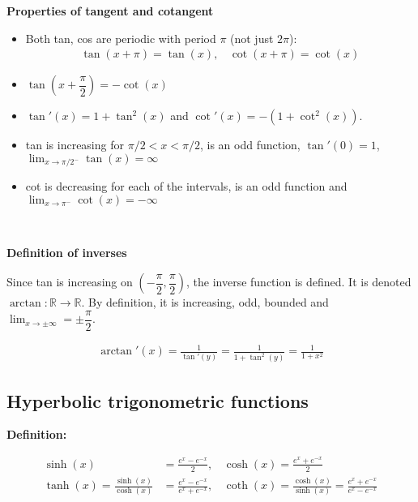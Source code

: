 \documentclass[11pt]{article}
\begin{document}
\textbf{Properties of tangent and cotangent} 
\begin{itemize}
 \item Both tan, cos are periodic with period $\pi$ (not just $2 \pi$): 
 \begin{align*}
     \tan(x + \pi) = \tan(x), ~~~~ \cot(x+\pi) = \cot(x)
 \end{align*}
 
 \item $\tan(x + \dfrac{\pi}{2}) = - \cot(x)$
 
 \item $\tan'(x) = 1 + \tan^2(x)$ and $\cot'(x) = -(1+\cot^2(x))$. 
 
 \item tan is increasing for $\pi/2 < x < \pi/2$, is an odd function, $\tan'(0) = 1$, $\lim_{x \to \pi/2^-} \tan(x) = \infty$ 
 
 \item cot is decreasing for each of the intervals, is an odd function and $\lim_{x \to \pi^-} \cot(x) = - \infty$
\end{itemize} 
\

\textbf{Definition of inverses} 

Since tan is increasing on $(-\dfrac{\pi}{2}, \dfrac{\pi}{2})$, the inverse function is defined. It is denoted $\arctan: \mathbb{R} \to \mathbb{R}$. By definition, it is increasing, odd, bounded and $\lim_{x \to \pm \infty} = \pm \dfrac{\pi}{2}$. 

\begin{align*}
    \arctan'(x) = \frac{1}{\tan'(y)} = \frac{1}{1 + \tan^2(y)} = \frac{1}{1+x^2}
\end{align*}

\newpage

\begin{center}
    \section*{Hyperbolic trigonometric functions}
\end{center}

\textbf{Definition:} 

\begin{align*}
    \sinh(x) &= \frac{e^x - e^{-x}}{2}, ~~~~ \cosh(x) = \frac{e^x+e^{-x}}{2} \\
    \tanh(x) = \frac{\sinh(x)}{\cosh(x)} &= \frac{e^x - e^{-x}}{e^x+e^{-x}}, ~~~~ \coth(x) = \frac{\cosh(x)}{\sinh(x)} = \frac{e^x+e^{-x}}{e^x-e^{-x}}
\end{align*}
\end{document}
